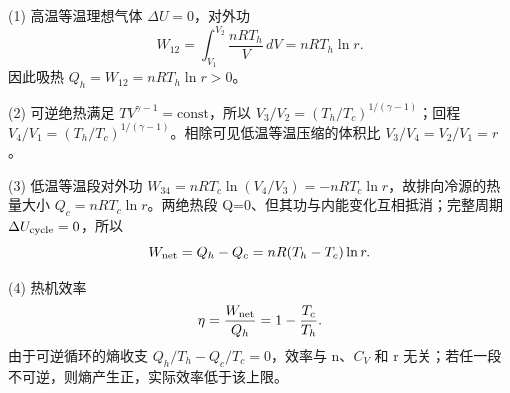 (1) 高温等温理想气体 \(\Delta U=0\)，对外功
\[
W_{12}=\int_{V_1}^{V_2}\frac{nRT_h}{V}\,dV=nRT_h\ln r.
\]
因此吸热 \(Q_h=W_{12}=nRT_h\ln r>0\)。

(2) 可逆绝热满足 \(TV^{\gamma-1}=\mathrm{const}\)，所以 \(V_3/V_2=(T_h/T_c)^{1/(\gamma-1)}\)；回程 \(V_4/V_1=(T_h/T_c)^{1/(\gamma-1)}\)。相除可见低温等温压缩的体积比 \(V_3/V_4=V_2/V_1=r\)。

(3) 低温等温段对外功 \(W_{34}=nRT_c\ln(V_4/V_3)=-nRT_c\ln r\)，故排向冷源的热量大小 \(Q_c=nRT_c\ln r\)。两绝热段 Q=0、但其功与内能变化互相抵消；完整周期 \(\Delta U_{\rm cycle}=0\)，所以
\[
W_{\rm net}=Q_h-Q_c=nR(T_h-T_c)\ln r.
\]

(4) 热机效率
\[
\eta=\frac{W_{\rm net}}{Q_h}=1-\frac{T_c}{T_h}.
\]
由于可逆循环的熵收支 \(Q_h/T_h-Q_c/T_c=0\)，效率与 n、\(C_V\) 和 r 无关；若任一段不可逆，则熵产生正，实际效率低于该上限。
